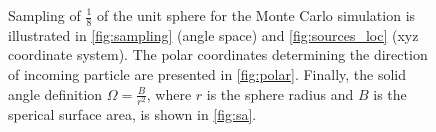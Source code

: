 \begin{figure}[!h]%
\centering
  \newline
  \noindent
  \caption{Sampling of $\frac{1}{8}$ of the unit sphere for the Monte Carlo simulation is illustrated in \ref{fig:sampling} (angle space) and \ref{fig:sources_loc} (xyz coordinate system). 
  The polar coordinates determining the direction of incoming particle are presented in \ref{fig:polar}. 
  Finally, the solid angle definition $\Omega = \frac{B}{r^{2}}$, where $r$ is the sphere radius and $B$ is the sperical surface area, is shown in \ref{fig:sa}. }
  \label{fig:mc_multi}
\end{figure}%

